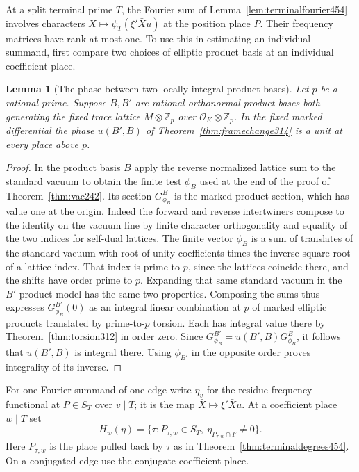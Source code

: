 \documentclass[a4paper,11pt]{article}
\newtheorem{lemma}[proposition]{Lemma}
\theoremstyle{definition}
\theoremstyle{remark}
\numberwithin{equation}{section}
\begin{document}
At a split terminal prime \(T\), the Fourier sum of
Lemma~\ref{lem:terminalfourier454} involves characters
\(X\mapsto\psi_T(\xi'\bar X u)\) at the position place \(P\).
Their frequency matrices have rank at most one. To use this
in estimating an individual summand, first compare two choices
of elliptic product basis at an individual coefficient place.

\begin{lemma}[The phase between two locally integral product bases]\leavevmode
\label{lem:unitframe455}
Let \(p\) be a rational prime. Suppose \(B,B'\) are rational
orthonormal product bases both generating the fixed trace
lattice \(M\otimes\mathbb Z_p\) over
\(\mathcal O_K\otimes\mathbb Z_p\). In the fixed marked
differential the phase \(u(B',B)\) of
Theorem~\ref{thm:framechange314} is a unit at every place
above \(p\).
\end{lemma}
\begin{proof}
In the product basis \(B\) apply the reverse normalized
lattice sum to the standard vacuum to obtain the finite test
\(\phi_B\) used at the end of the proof of
Theorem~\ref{thm:vac242}. Its section \(G^B_{\phi_B}\) is the
marked product section, which has value one at the origin.
Indeed the forward and reverse intertwiners compose to the
identity on the vacuum line by finite character orthogonality
and equality of the two indices for self-dual lattices.
The finite vector \(\phi_B\) is a sum of translates of the
standard vacuum with root-of-unity coefficients times the
inverse square root of a lattice index. That index is prime
to \(p\), since the lattices coincide there, and the shifts
have order prime to \(p\). Expanding that same standard
vacuum in the \(B'\) product model has the same two properties.
Composing the sums thus expresses \(G^{B'}_{\phi_B}(0)\)
as an integral linear combination at \(p\) of marked elliptic
products translated by prime-to-\(p\) torsion. Each has
integral value there by Theorem~\ref{thm:torsion312} in order
zero. Since \(G^{B'}_{\phi_B}=u(B',B)G^B_{\phi_B}\), it follows
that \(u(B',B)\) is integral there. Using \(\phi_{B'}\) in the
opposite order proves integrality of its inverse.
\end{proof}

For one Fourier summand of one edge write \(\eta_v\) for the
residue frequency functional at \(P\in S_T\) over \(v\mid T\);
it is the map \(\bar X\mapsto\xi'\bar Xu\). At a coefficient
place \(w\mid T\) set
\[
 H_w(\eta)=\{\tau:P_{\tau,w}\in S_T,\
             \eta_{P_{\tau,w}\cap F}\ne0\}.
\]
Here \(P_{\tau,w}\) is the place pulled back by \(\tau\) as
in Theorem~\ref{thm:terminaldegrees454}. On a conjugated edge
use the conjugate coefficient place.
\end{document}
